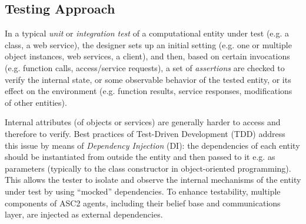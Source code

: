 

\subsection{Testing Approach\label{sec:testing-approach}}



In a typical \textit{unit} or \textit{integration test} of a computational entity under test (e.g. a class, a web service), the designer sets up an initial setting (e.g. one or multiple object instances, web services, a client), and then, based on certain invocations (e.g. function calls, access/service requests), a set of \textit{assertions} are checked to verify the internal state, or some observable behavior of the tested entity, or its effect on the environment (e.g. function results, service responses, modifications of other entities). 

Internal attributes (of objects or services) are generally harder to access and therefore to verify. Best practices of Test-Driven Development (TDD) address this issue by means of \textit{Dependency Injection} (DI): the dependencies of each entity should be instantiated from outside the entity and then passed to it e.g. as parameters (typically to the class constructor in object-oriented programming). %
This allows the tester to isolate and observe the internal mechanisms of the entity under test by using ``mocked'' dependencies. 
To enhance testability, multiple components of ASC2 agents, including their belief base and communications layer, are injected as external dependencies.

